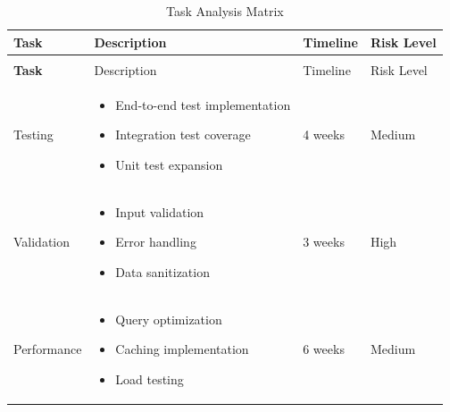\begin{tcolorbox}[
    enhanced,
    title={Implementation Analysis},
    attach boxed title to top left,
    boxed title style={
        colback=info!50,
        colframe=info!50,
        arc=0mm,
    },
    colback=white,
    colframe=info!50,
    arc=0mm,
    fonttitle=\bfseries
]
    \begin{center}
    \begin{longtable}{>{\bfseries}p{}p{}p{}p{}}
        \caption{Task Analysis Matrix} \\
        \toprule
        Task & Description & Timeline & Risk Level \\
        \midrule
        \endfirsthead
        
        \multicolumn{4}{c}{(continued)} \\
        \toprule
        Task & Description & Timeline & Risk Level \\
        \midrule
        \endhead
        
        \bottomrule
        \endfoot
        
        Testing & 
        \begin{itemize}[nosep]
            \item End-to-end test implementation
            \item Integration test coverage
            \item Unit test expansion
        \end{itemize} &
        4 weeks &
        \textcolor{warning}{Medium} \\
        \midrule
        
        Validation & 
        \begin{itemize}[nosep]
            \item Input validation
            \item Error handling
            \item Data sanitization
        \end{itemize} &
        3 weeks &
        \textcolor{danger}{High} \\
        \midrule
        
        Performance & 
        \begin{itemize}[nosep]
            \item Query optimization
            \item Caching implementation
            \item Load testing
        \end{itemize} &
        6 weeks &
        \textcolor{warning}{Medium} \\
        \midrule
        

\end{longtable}
\end{center}
\end{tcolorbox}
